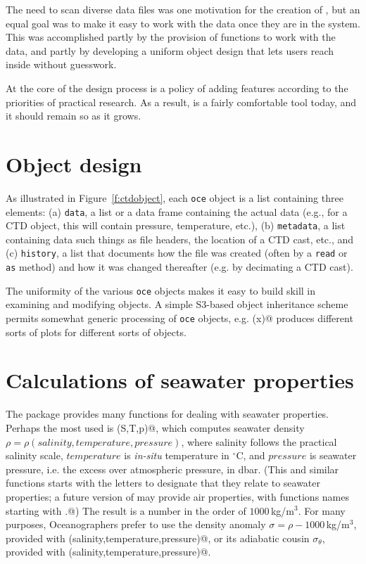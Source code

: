 \documentclass{article}
\begin{document}
The need to scan diverse data files was one motivation for the creation of
\verb@oce@, but an equal goal was to make it easy to work with the data once
they are in the system.  This was accomplished partly by the provision of
functions to work with the data, and partly by developing a uniform object
design that lets users reach inside without guesswork.

At the core of the \verb@oce@ design process is a policy of adding features
according to the priorities of practical research. As a result, \verb@oce@ is a
fairly comfortable tool today, and it should remain so as it grows.


\section{Object design}

As illustrated in Figure~\ref{f:ctdobject}, each \texttt{oce} object is a list
containing three elements: (a) \texttt{data}, a list or a data frame containing
the actual data (e.g., for a CTD object, this will contain pressure,
temperature, etc.), (b) \texttt{metadata}, a list containing data such things as
file headers, the location of a CTD cast, etc., and (c) \texttt{history},
a list that documents how the file was created (often by a \texttt{read} or
\texttt{as} method) and how it was changed thereafter (e.g. by decimating a CTD
cast).

The uniformity of the various \texttt{oce} objects makes it easy to build skill
in examining and modifying objects.  A simple S3-based object inheritance scheme
permits somewhat generic processing of \texttt{oce} objects, e.g. \verb@plot(x)@
produces different sorts of plots for different sorts of \verb@x@ objects.


\section{Calculations of seawater properties}


The \verb@oce@ package provides many functions for dealing with
seawater properties. Perhaps the most used is \verb@swRho(S,T,p)@,
which computes seawater density $\rho=\rho(salinity, temperature,
pressure)$, where salinity follows the practical salinity scale,
$temperature$ is \emph{in-situ} temperature in $^\circ$C, and
$pressure$ is seawater pressure, i.e. the excess over atmospheric
pressure, in dbar.  (This and similar functions starts with the
letters \verb@sw@ to designate that they relate to seawater
properties; a future version of \verb@oce@ may provide air properties,
with functions names starting with \verb@air.@) The result is a number
in the order of $1000$\,kg/m$^3$.  For many purposes, Oceanographers
prefer to use the density anomaly $\sigma=\rho-1000$\,kg/m$^3$,
provided with \verb@swSigma(salinity,temperature,pressure)@, or its
adiabatic cousin $\sigma_\theta$, provided with
\verb@swSigmaTheta(salinity,temperature,pressure)@.
\end{document}
